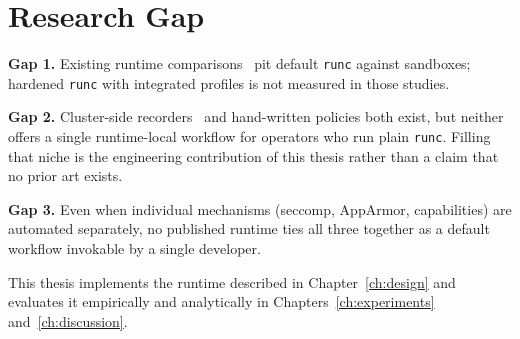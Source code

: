 \section{Research Gap}

\textbf{Gap 1.} Existing runtime comparisons~\cite{wang2022,volpert2024,viktorsson2020,jang2022secquant} pit default \texttt{runc} against sandboxes; hardened \texttt{runc} with integrated profiles is not measured in those studies.

\textbf{Gap 2.} Cluster-side recorders~\cite{spo2025,inspektorgadget2025} and hand-written policies both exist, but neither offers a single runtime-local workflow for operators who run plain \texttt{runc}. Filling that niche is the engineering contribution of this thesis rather than a claim that no prior art exists.

\textbf{Gap 3.} Even when individual mechanisms (seccomp, AppArmor, capabilities) are automated separately, no published runtime ties all three together as a default workflow invokable by a single developer.

This thesis implements the runtime described in Chapter~\ref{ch:design} and evaluates it empirically and analytically in Chapters~\ref{ch:experiments} and~\ref{ch:discussion}.
